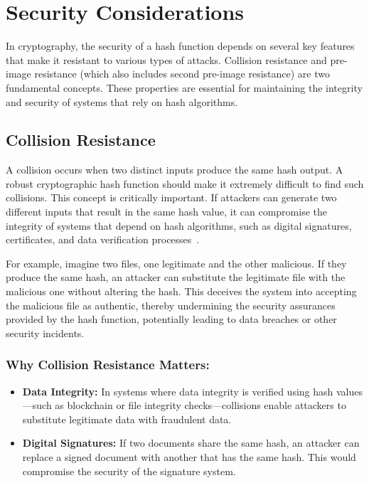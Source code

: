 \documentclass[11pt,a4paper]{article}
\begin{document}
\section*{Security Considerations}
In cryptography, the security of a hash function depends on several key features that make it resistant to various types of attacks. Collision resistance and pre-image resistance (which also includes second pre-image resistance) are two fundamental concepts. These properties are essential for maintaining the integrity and security of systems that rely on hash algorithms.

    \subsection*{Collision Resistance}
    A collision occurs when two distinct inputs produce the same hash output. A robust cryptographic hash function should make it extremely difficult to find such collisions. This concept is critically important. If attackers can generate two different inputs that result in the same hash value, it can compromise the integrity of systems that depend on hash algorithms, such as digital signatures, certificates, and data verification processes~\cite{MD5-Attacks}.

    For example, imagine two files, one legitimate and the other malicious. If they produce the same hash, an attacker can substitute the legitimate file with the malicious one without altering the hash. This deceives the system into accepting the malicious file as authentic, thereby undermining the security assurances provided by the hash function, potentially leading to data breaches or other security incidents.

        \subsubsection*{Why Collision Resistance Matters:}
        \begin{itemize}
                \item \textbf{Data Integrity:} In systems where data integrity is verified using hash values—such as blockchain or file integrity checks—collisions enable attackers to substitute legitimate data with fraudulent data.
                
                \item \textbf{Digital Signatures:} If two documents share the same hash, an attacker can replace a signed document with another that has the same hash. This would compromise the security of the signature system.
        \end{itemize}
\end{document}
